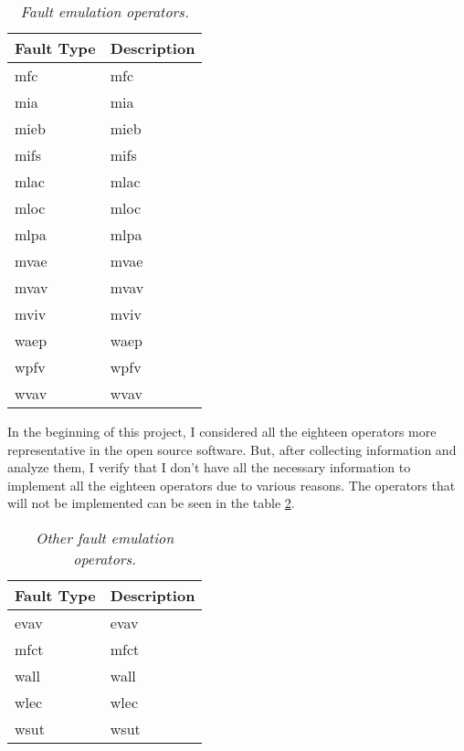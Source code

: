\begin{table}[!ht]
\begin{tabular}{|l|p{12cm}|}
\hline
\textbf{Fault Type}		& \multicolumn{1}{c|}{\textbf{Description}}		\\ \hline \hline
\acs{mfc}        				& \Acl{mfc}  									\\ \hline
\acs{mia}        				& \Acl{mia}  									\\ \hline
\acs{mieb}       				& \Acl{mieb} 									\\ \hline
\acs{mifs}       				& \Acl{mifs} 									\\ \hline
\acs{mlac}       				& \Acl{mlac} 									\\ \hline
\acs{mloc}       				& \Acl{mloc} 									\\ \hline
\acs{mlpa}       				& \Acl{mlpa} 									\\ \hline
\acs{mvae}       				& \Acl{mvae} 									\\ \hline
\acs{mvav}       				& \Acl{mvav} 									\\ \hline
\acs{mviv}       				& \Acl{mviv} 									\\ \hline
\acs{waep}       				& \Acl{waep} 									\\ \hline
\acs{wpfv}       				& \Acl{wpfv} 									\\ \hline
\acs{wvav}       				& \Acl{wvav} 									\\ \hline
\end{tabular}
\caption{\small \sl Fault emulation operators.\label{tab:faultEmulationOperators}}
\end{table}

In the beginning of this project, I considered all the eighteen operators more representative in the open source software. But, after collecting information and analyze them, I verify that I don't have all the necessary information to implement all the eighteen operators due to various reasons.
The operators that will not be implemented can be seen in the table \ref{tab:otherfaultEmulationOperators}.

\begin{table}[!ht]
\begin{tabular}{|l|p{12cm}|}
\hline
\textbf{Fault Type}		& \multicolumn{1}{c|}{\textbf{Description}}		\\ \hline \hline
\acs{evav}        				& \Acl{evav}  									\\ \hline
\acs{mfct}        				& \Acl{mfct}  									\\ \hline
\acs{wall}       				& \Acl{wall} 									\\ \hline
\acs{wlec}       				& \Acl{wlec} 									\\ \hline
\acs{wsut}       				& \Acl{wsut} 									\\ \hline
\end{tabular}
\caption{\small \sl Other fault emulation operators.\label{tab:otherfaultEmulationOperators}}
\end{table}

